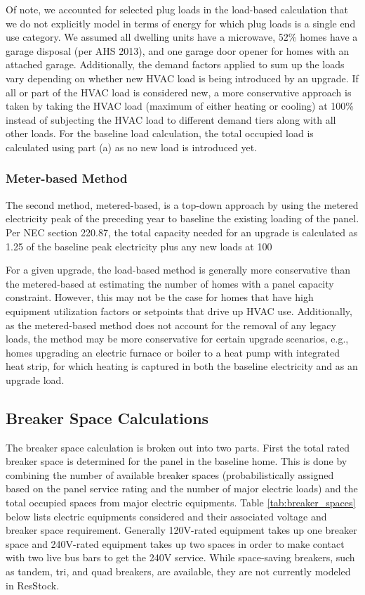 Of note, we accounted for selected plug loads in the load-based calculation that we do not explicitly model in terms of energy for which plug loads is a single end use category. We assumed all dwelling units have a microwave, 52\% homes have a garage disposal (per AHS 2013), and one garage door opener for homes with an attached garage. Additionally, the demand factors applied to sum up the loads vary depending on whether new HVAC load is being introduced by an upgrade. If all or part of the HVAC load is considered new, a more conservative approach is taken by taking the HVAC load (maximum of either heating or cooling) at 100\% instead of subjecting the HVAC load to different demand tiers along with all other loads. For the baseline load calculation, the total occupied load is calculated using part (a) as no new load is introduced yet.

\subsubsection{Meter-based Method}
The second method, metered-based, is a top-down approach by using the metered electricity peak of the preceding year to baseline the existing loading of the panel. Per NEC section 220.87, the total capacity needed for an upgrade is calculated as 1.25 of the baseline peak electricity plus any new loads at 100%

For a given upgrade, the load-based method is generally more conservative than the metered-based at estimating the number of homes with a panel capacity constraint. However, this may not be the case for homes that have high equipment utilization factors or setpoints that drive up HVAC use. Additionally, as the metered-based method does not account for the removal of any legacy loads, the method may be more conservative for certain upgrade scenarios, e.g., homes upgrading an electric furnace or boiler to a heat pump with integrated heat strip, for which heating is captured in both the baseline electricity and as an upgrade load.

\subsection{Breaker Space Calculations}
The breaker space calculation is broken out into two parts. First the total rated breaker space is determined for the panel in the baseline home. This is done by combining the number of available breaker spaces (probabilistically assigned based on the panel service rating and the number of major electric loads) and the total occupied spaces from major electric equipments. Table \ref{tab:breaker_spaces} below lists electric equipments considered and their associated voltage and breaker space requirement. Generally 120V-rated equipment takes up one breaker space and 240V-rated equipment takes up two spaces in order to make contact with two live bus bars to get the 240V service. While space-saving breakers, such as tandem, tri, and quad breakers, are available, they are not currently modeled in ResStock.

